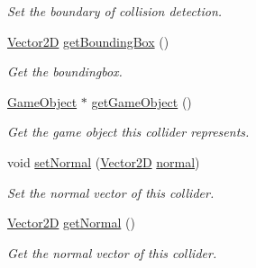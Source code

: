 \begin{DoxyCompactItemize}
\begin{DoxyCompactList}\small\item\em Set the boundary of collision detection. \end{DoxyCompactList}\item 
\mbox{\hyperlink{struct_vector2_d}{Vector2D}} \mbox{\hyperlink{class_collider_a1568326683a3d1de3aedeaa22a36bdde}{get\+Bounding\+Box}} ()
\begin{DoxyCompactList}\small\item\em Get the boundingbox. \end{DoxyCompactList}\item 
\mbox{\hyperlink{class_game_object}{Game\+Object}} $\ast$ \mbox{\hyperlink{class_collider_af02a08d0a8ee0727d7e71b22bafc762f}{get\+Game\+Object}} ()
\begin{DoxyCompactList}\small\item\em Get the game object this collider represents. \end{DoxyCompactList}\item 
\mbox{\label{class_collider_abdd9452e37a8e9e0012becf31169a463}} 
void \mbox{\hyperlink{class_collider_abdd9452e37a8e9e0012becf31169a463}{set\+Normal}} (\mbox{\hyperlink{struct_vector2_d}{Vector2D}} \mbox{\hyperlink{class_collider_a9326e2676880c40f35832ed2c6d6b073}{normal}})
\begin{DoxyCompactList}\small\item\em Set the normal vector of this collider. \end{DoxyCompactList}\item 
\mbox{\label{class_collider_a4849a48d9226958af3203fb7de8a8390}} 
\mbox{\hyperlink{struct_vector2_d}{Vector2D}} \mbox{\hyperlink{class_collider_a4849a48d9226958af3203fb7de8a8390}{get\+Normal}} ()
\begin{DoxyCompactList}\small\item\em Get the normal vector of this collider. \end{DoxyCompactList}\end{DoxyCompactItemize}
